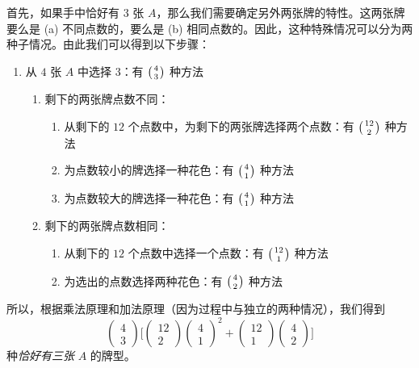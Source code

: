\begin{example}[至少三张 $A$]
    首先，如果手中恰好有 $3$ 张 $A$，那么我们需要确定另外两张牌的特性。这两张牌要么是 (a) 不同点数的，要么是 (b) 相同点数的。因此，这种特殊情况可以分为两种子情况。由此我们可以得到以下步骤：
    \begin{enumerate}
        \item 从 $4$ 张 $A$ 中选择 $3$：有 $\big({4 \atop 3}\big)$ 种方法
              \begin{enumerate}[label=(\alph*)]
                  \item 剩下的两张牌点数不同：
                        \begin{enumerate}[label=(\roman*)]
                            \item 从剩下的 $12$ 个点数中，为剩下的两张牌选择两个点数：有 $\big({12 \atop 2}\big)$ 种方法
                            \item 为点数较小的牌选择一种花色：有 $\big({4 \atop 1}\big)$ 种方法
                            \item 为点数较大的牌选择一种花色：有 $\big({4 \atop 1}\big)$ 种方法
                        \end{enumerate}
                  \item 剩下的两张牌点数相同：
                        \begin{enumerate}[label=(\roman*)]
                            \item 从剩下的 $12$ 个点数中选择一个点数：有 $\big({12 \atop 1}\big)$ 种方法
                            \item 为选出的点数选择两种花色：有 $\big({4 \atop 2}\big)$ 种方法
                        \end{enumerate}
              \end{enumerate}
    \end{enumerate}
    所以，根据乘法原理和加法原理（因为过程中与独立的两种情况），我们得到
    \[\begin{pmatrix}
            4 \\
            3
        \end{pmatrix}\Bigg[\begin{pmatrix}
                12 \\
                2
            \end{pmatrix} \begin{pmatrix}
                4 \\
                1
            \end{pmatrix}^2 + \begin{pmatrix}
                12 \\
                1
            \end{pmatrix} \begin{pmatrix}
                4 \\
                2
            \end{pmatrix}\Bigg]\]
    种\emph{恰好有三张} $A$ 的牌型。\\


\end{example}
